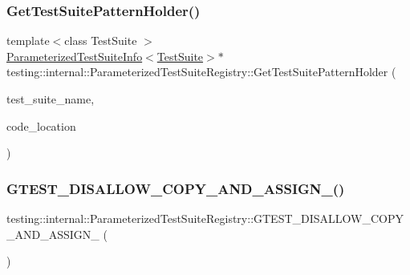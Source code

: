 \subsubsection{\texorpdfstring{GetTestSuitePatternHolder()}{GetTestSuitePatternHolder()}\hspace{0.1cm}{\footnotesize\ttfamily [2/2]}}
{\footnotesize\ttfamily template$<$class Test\+Suite $>$ \\
\mbox{\hyperlink{classtesting_1_1internal_1_1_parameterized_test_suite_info}{Parameterized\+Test\+Suite\+Info}}$<$\mbox{\hyperlink{classtesting_1_1_test_suite}{Test\+Suite}}$>$$\ast$ testing\+::internal\+::\+Parameterized\+Test\+Suite\+Registry\+::\+Get\+Test\+Suite\+Pattern\+Holder (\begin{DoxyParamCaption}\item[{const char $\ast$}]{test\+\_\+suite\+\_\+name,  }\item[{\mbox{\hyperlink{structtesting_1_1internal_1_1_code_location}{Code\+Location}}}]{code\+\_\+location }\end{DoxyParamCaption})\hspace{0.3cm}{\ttfamily [inline]}}

\mbox{\label{classtesting_1_1internal_1_1_parameterized_test_suite_registry_ac1454da4ff60ddeda6b4e60f1b6ce606}} 
\subsubsection{\texorpdfstring{GTEST\_DISALLOW\_COPY\_AND\_ASSIGN\_()}{GTEST\_DISALLOW\_COPY\_AND\_ASSIGN\_()}\hspace{0.1cm}{\footnotesize\ttfamily [1/2]}}
{\footnotesize\ttfamily testing\+::internal\+::\+Parameterized\+Test\+Suite\+Registry\+::\+G\+T\+E\+S\+T\+\_\+\+D\+I\+S\+A\+L\+L\+O\+W\+\_\+\+C\+O\+P\+Y\+\_\+\+A\+N\+D\+\_\+\+A\+S\+S\+I\+G\+N\+\_\+ (\begin{DoxyParamCaption}\item[{\mbox{\hyperlink{classtesting_1_1internal_1_1_parameterized_test_suite_registry}{Parameterized\+Test\+Suite\+Registry}}}]{ }\end{DoxyParamCaption})\hspace{0.3cm}{\ttfamily [private]}}

